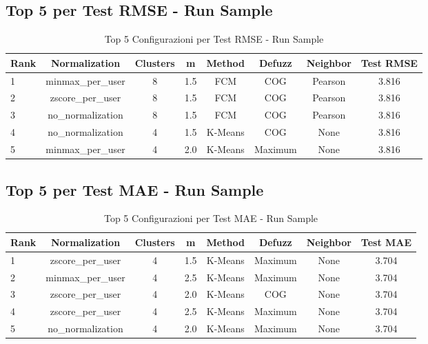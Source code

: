 \subsection{Top 5 per Test RMSE - Run Sample}
\begin{table}[h]
    \centering
    \caption{Top 5 Configurazioni per Test RMSE - Run Sample}
    \begin{tabular}{|l|c|c|c|c|c|c|c|}
    \hline
    \textbf{Rank} & \textbf{Normalization} & \textbf{Clusters} & \textbf{m} & \textbf{Method} & \textbf{Defuzz} & \textbf{Neighbor} & \textbf{Test RMSE} \\
    \hline
    1 & minmax\_per\_user & 8 & 1.5 & FCM & COG & Pearson & 3.816 \\
    2 & zscore\_per\_user & 8 & 1.5 & FCM & COG & Pearson & 3.816 \\
    3 & no\_normalization & 8 & 1.5 & FCM & COG & Pearson & 3.816 \\
    4 & no\_normalization & 4 & 1.5 & K-Means & COG & None & 3.816 \\
    5 & minmax\_per\_user & 4 & 2.0 & K-Means & Maximum & None & 3.816 \\
    \hline
    \end{tabular}
    \end{table}

\subsection{Top 5 per Test MAE - Run Sample}
\begin{table}[h]
    \centering
    \caption{Top 5 Configurazioni per Test MAE - Run Sample}
    \begin{tabular}{|l|c|c|c|c|c|c|c|}
    \hline
    \textbf{Rank} & \textbf{Normalization} & \textbf{Clusters} & \textbf{m} & \textbf{Method} & \textbf{Defuzz} & \textbf{Neighbor} & \textbf{Test MAE} \\
    \hline
    1 & zscore\_per\_user & 4 & 1.5 & K-Means & Maximum & None & 3.704 \\
    2 & minmax\_per\_user & 4 & 2.5 & K-Means & Maximum & None & 3.704 \\
    3 & zscore\_per\_user & 4 & 2.0 & K-Means & COG & None & 3.704 \\
    4 & zscore\_per\_user & 4 & 2.5 & K-Means & Maximum & None & 3.704 \\
    5 & no\_normalization & 4 & 2.0 & K-Means & Maximum & None & 3.704 \\
    \hline
    \end{tabular}
    \end{table}

